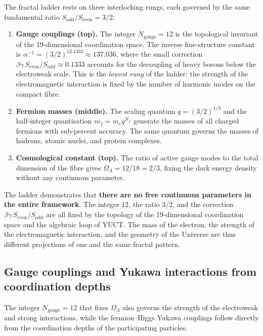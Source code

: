 \documentclass[12pt,a4paper]{article}
\begin{document}
The fractal ladder rests on three interlocking rungs, each governed by the same
fundamental ratio \(S_{\mathrm{odd}}/S_{\mathrm{even}} = 3/2\):

\begin{enumerate}[leftmargin=*]
	\item \textbf{Gauge couplings (top).} The integer \(N_{\mathrm{gauge}} = 12\) is the
	topological invariant of the 19‑dimensional coordination space.
	The inverse fine‑structure constant is \(\alpha^{-1} = (3/2)^{12.1333} \approx 137.036\),
	where the small correction \(\beta\gamma\,S_{\mathrm{even}}/S_{\mathrm{odd}} \approx 0.1333\)
	accounts for the decoupling of heavy bosons below the electroweak scale.
	This is the \emph{lowest rung} of the ladder: the strength of the electromagnetic
	interaction is fixed by the number of harmonic modes on the compact fibre.
	\item \textbf{Fermion masses (middle).} The scaling quantum \(q = (3/2)^{1/3}\) and the
	half‑integer quantisation \(m_f = m_e q^{N_f}\) generate the masses of all charged
	fermions with sub‑percent accuracy.  The same quantum governs the masses of
	hadrons, atomic nuclei, and protein complexes.
	\item \textbf{Cosmological constant (top).} The ratio of active gauge modes to the total
	dimension of the fibre gives \(\Omega_\Lambda = 12/18 = 2/3\), fixing the dark energy
	density without any continuous parameter.
\end{enumerate}

The ladder demonstrates that \textbf{there are no free continuous parameters in the
	entire framework}.  The integer \(12\), the ratio \(3/2\), and the correction
\(\beta\gamma\,S_{\mathrm{even}}/S_{\mathrm{odd}}\) are all fixed by the topology of the
19‑dimensional coordination space and the algebraic loop of YUCT.  The mass of the
electron, the strength of the electromagnetic interaction, and the geometry of the
Universe are thus different projections of one and the same fractal pattern.

	\subsection{Gauge couplings and Yukawa interactions from coordination depths}
	
	The integer \(N_{\mathrm{gauge}} = 12\) that fixes \(\Omega_\Lambda\) also governs the strength of the
	electroweak and strong interactions, while the fermion–Higgs Yukawa couplings follow directly
	from the coordination depths of the participating particles.
	
\end{document}
